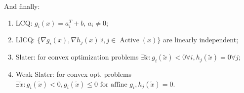 And finally: 

\begin{lemma}
    \begin{enumerate}
        \item LCQ: $g_i(x) = a_i^T + b$, $a_i \neq 0$; 
        \item LICQ: $\{\nabla g_i(x), \nabla h_j(x) \vert i, j \in \operatorname{Active}(x)\}$ are linearly independent;
        \item Slater: for convex optimization problems $\exists \widetilde{x} : g_i(\widetilde{x}) < 0 \forall i, h_j(\widetilde{x}) = 0 \forall j$;
        \item Weak Slater: for convex opt. problems $\exists \widetilde{x} : g_i(\widetilde{x}) < 0, g_i(\widetilde{x}) \leq 0 \text{ for affine } g_i, h_j(\widetilde{x}) = 0$.
    \end{enumerate}
\end{lemma}

